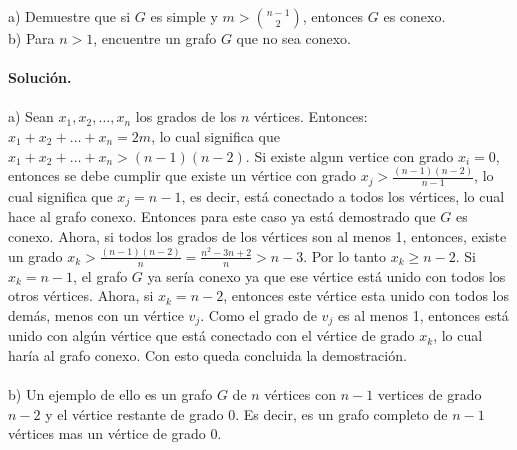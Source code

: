 \documentclass[12pt]{article}
\newenvironment{ejercicio}[2][Ejercicio]{\begin{trivlist}
\item[\hskip \labelsep {\bfseries #1}\hskip \labelsep {\bfseries #2.}]}{\end{trivlist}}
\begin{document}
\begin{ejercicio}{1.1.12}
\end{ejercicio}
a) Demuestre que si $G$ es simple y $ m > \binom{n-1}{2}$, entonces $G$ es conexo.
\\
b) Para $n > 1$, encuentre un grafo $G$ que no sea conexo.
\\\\
\textbf{Solución.} 
\\\\
a) Sean $x_1, x_2, \ldots, x_n$ los grados de los $n$ vértices. Entonces:
$x_1 + x_2 + \ldots + x_n = 2m$, lo cual significa que $x_1 + x_2 + \ldots + x_n > (n-1)(n-2) $. Si existe algun vertice con grado $x_i = 0$, entonces se debe cumplir que existe un vértice con grado $x_j > \frac{(n-1)(n-2)}{n-1}$, lo cual significa que $x_j = n-1$, es decir, está conectado a todos los vértices, lo cual hace al grafo conexo. Entonces para este caso ya está demostrado que $G$ es conexo. Ahora, si todos los grados de los vértices son al menos 1, entonces, existe un grado $x_k > \frac{(n-1)(n-2)}{n} = \frac{n^2 - 3n + 2}{n} > n-3 $. Por lo tanto $ x_k \geq n-2 $. Si $x_k = n-1$, el grafo $G$ ya sería conexo ya que ese vértice está unido con todos los otros vértices. Ahora, si $x_k = n-2$, entonces este vértice esta unido con todos los demás, menos con un vértice $v_j$. Como el grado de $v_j$ es al menos 1, entonces está unido con algún vértice que está conectado con el vértice de grado $x_k$, lo cual haría al grafo conexo. Con esto queda concluida la demostración.
\\\\
b) Un ejemplo de ello es un grafo $G$ de $n$ vértices con $n-1$ vertices de grado $n-2$ y el vértice restante de grado 0. Es decir, es un grafo completo de $n-1$ vértices mas un vértice de grado 0.
\end{document}
